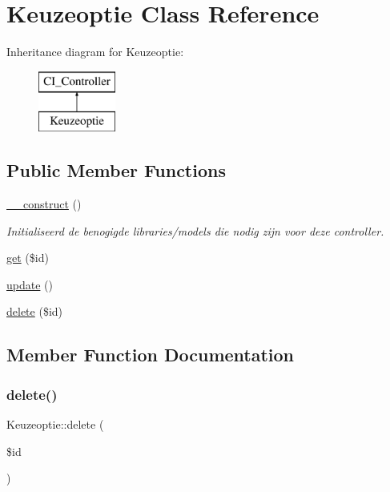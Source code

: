 \hypertarget{class_keuzeoptie}{}\section{Keuzeoptie Class Reference}
\label{class_keuzeoptie}
Inheritance diagram for Keuzeoptie\+:\begin{figure}[H]
\begin{center}
\leavevmode
\includegraphics[height=2.000000cm]{class_keuzeoptie}
\end{center}
\end{figure}
\subsection*{Public Member Functions}
\begin{DoxyCompactItemize}
\item 
\mbox{\label{class_keuzeoptie_a6ae8df82eb6e4ca3774f76a7ba1e165b}} 
\mbox{\hyperlink{class_keuzeoptie_a6ae8df82eb6e4ca3774f76a7ba1e165b}{\+\_\+\+\_\+construct}} ()
\begin{DoxyCompactList}\small\item\em Initialiseerd de benogigde libraries/models die nodig zijn voor deze controller. \end{DoxyCompactList}\item 
\mbox{\hyperlink{class_keuzeoptie_abe1857ac53d46fe3f2ff1e601c46739a}{get}} (\$id)
\item 
\mbox{\hyperlink{class_keuzeoptie_abb3bade0f37d81dc061789c5a3dba930}{update}} ()
\item 
\mbox{\hyperlink{class_keuzeoptie_a0b17edfec4d51362fe3863774dbbb1cf}{delete}} (\$id)
\end{DoxyCompactItemize}


\subsection{Member Function Documentation}
\mbox{\label{class_keuzeoptie_a0b17edfec4d51362fe3863774dbbb1cf}} 
\subsubsection{\texorpdfstring{delete()}{delete()}}
{\footnotesize\ttfamily Keuzeoptie\+::delete (\begin{DoxyParamCaption}\item[{}]{\$id }\end{DoxyParamCaption})}

